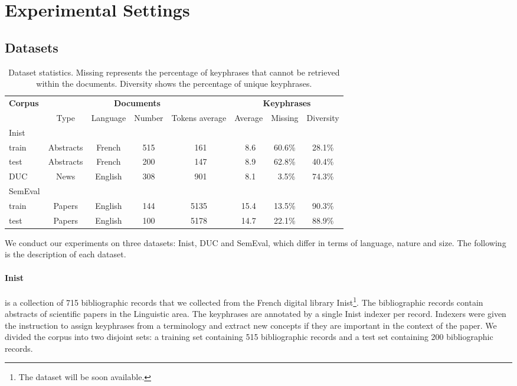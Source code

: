 \section{Experimental Settings}
\label{sec:experimental_settings}
  \subsection{Datasets}
  \label{subsec:datasets}
    \begin{table*}
      \centering
      \begin{tabular}{l|cccc|ccc}
        \toprule
        \multirow{2}{*}{\textbf{Corpus}} & \multicolumn{4}{c|}{\textbf{Documents}} & \multicolumn{3}{c}{\textbf{Keyphrases}}\\
        \cline{2-8}
        & Type & Language & Number & Tokens average & Average & Missing & Diversity\\
        \hline
        Inist & & & & & & &\\
        \hfill{}train & Abstracts & French & 515 & $~~$161 & $~~$8.6 & 60.6\% & 28.1\%\\
        \hfill{}test & Abstracts & French & 200 & $~~$147 & $~~$8.9 & 62.8\% & 40.4\%\\
        \hline
        DUC & News & English & 308 & $~~$901 & $~~$8.1 & $~~$3.5\% & 74.3\%\\
        \hline
        SemEval & & & & & & &\\
        \hfill{}train & Papers & English & 144 & 5135 & 15.4 & 13.5\% & 90.3\%\\
        \hfill{}test & Papers & English & 100 & 5178 & 14.7 & 22.1\% & 88.9\%\\
        \bottomrule
      \end{tabular}
      \caption{Dataset statistics. Missing represents the percentage of keyphrases
               that cannot be retrieved within the documents. Diversity shows the
               percentage of unique keyphrases.
               \label{tab:corpus_statistics}}
    \end{table*}
    We conduct our experiments on three datasets: Inist, DUC and SemEval, which differ
    in terms of language, nature and size. The following is the description of
    each dataset.

    \paragraph{Inist} is a collection of 715 bibliographic records that we
    collected from the French digital library Inist\footnote{The dataset will be soon available.}. The bibliographic records
    contain abstracts of scientific papers in the Linguistic area. The
    keyphrases are annotated by a single Inist indexer per record. Indexers were
    given the instruction to assign keyphrases from a terminology and extract new
    concepts if they are important in the context of the paper. We divided the
    corpus into two disjoint sets: a training set containing 515 bibliographic
    records and a test set containing 200 bibliographic records.

